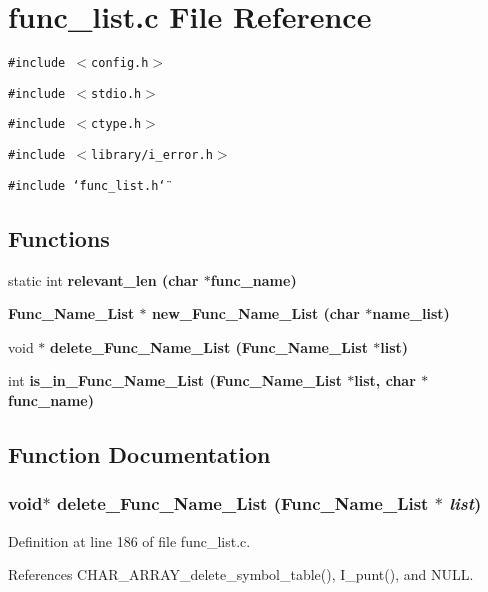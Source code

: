 \section{func\_\-list.c File Reference}
\label{func__list_8c}
{\tt \#include $<$config.h$>$}\par
{\tt \#include $<$stdio.h$>$}\par
{\tt \#include $<$ctype.h$>$}\par
{\tt \#include $<$library/i\_\-error.h$>$}\par
{\tt \#include \char`\"{}func\_\-list.h\char`\"{}}\par
\subsection*{Functions}
\begin{CompactItemize}
\item 
static int \bf{relevant\_\-len} (char $\ast$func\_\-name)
\item 
\bf{Func\_\-Name\_\-List} $\ast$ \bf{new\_\-Func\_\-Name\_\-List} (char $\ast$name\_\-list)
\item 
void $\ast$ \bf{delete\_\-Func\_\-Name\_\-List} (\bf{Func\_\-Name\_\-List} $\ast$\bf{list})
\item 
int \bf{is\_\-in\_\-Func\_\-Name\_\-List} (\bf{Func\_\-Name\_\-List} $\ast$\bf{list}, char $\ast$func\_\-name)
\end{CompactItemize}


\subsection{Function Documentation}
\subsubsection{\setlength{\rightskip}{0pt plus 5cm}void$\ast$ delete\_\-Func\_\-Name\_\-List (\bf{Func\_\-Name\_\-List} $\ast$ {\em list})}\label{func__list_8c_4dbeeb1df003cb357dad8a5ec5e9c21d}




Definition at line 186 of file func\_\-list.c.

References CHAR\_\-ARRAY\_\-delete\_\-symbol\_\-table(), I\_\-punt(), and NULL.
